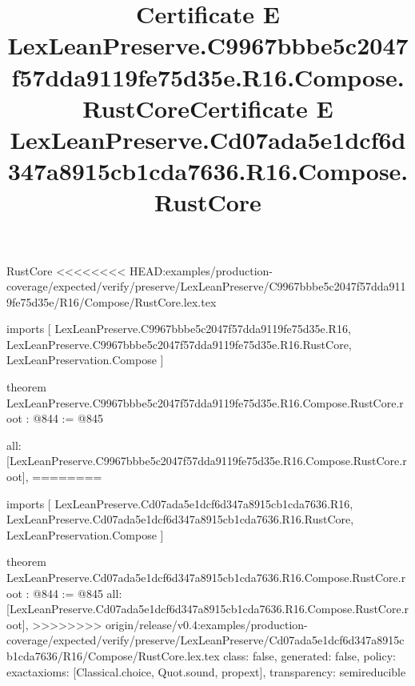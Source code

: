 \begin{lexlean}{RustCore}
<<<<<<<< HEAD:examples/production-coverage/expected/verify/preserve/LexLeanPreserve/C9967bbbe5c2047f57dda9119fe75d35e/R16/Compose/RustCore.lex.tex
\title{Certificate E LexLeanPreserve.C9967bbbe5c2047f57dda9119fe75d35e.R16.Compose.RustCore}
\begin{coremodule}
imports [
  LexLeanPreserve.C9967bbbe5c2047f57dda9119fe75d35e.R16,
  LexLeanPreserve.C9967bbbe5c2047f57dda9119fe75d35e.R16.RustCore,
  LexLeanPreservation.Compose
]

theorem LexLeanPreserve.C9967bbbe5c2047f57dda9119fe75d35e.R16.Compose.RustCore.root : @844 := @845 {
  all: [LexLeanPreserve.C9967bbbe5c2047f57dda9119fe75d35e.R16.Compose.RustCore.root],
========
\title{Certificate E LexLeanPreserve.Cd07ada5e1dcf6d347a8915cb1cda7636.R16.Compose.RustCore}
\begin{coremodule}
imports [
  LexLeanPreserve.Cd07ada5e1dcf6d347a8915cb1cda7636.R16,
  LexLeanPreserve.Cd07ada5e1dcf6d347a8915cb1cda7636.R16.RustCore,
  LexLeanPreservation.Compose
]

theorem LexLeanPreserve.Cd07ada5e1dcf6d347a8915cb1cda7636.R16.Compose.RustCore.root : @844 := @845 {
  all: [LexLeanPreserve.Cd07ada5e1dcf6d347a8915cb1cda7636.R16.Compose.RustCore.root],
>>>>>>>> origin/release/v0.4:examples/production-coverage/expected/verify/preserve/LexLeanPreserve/Cd07ada5e1dcf6d347a8915cb1cda7636/R16/Compose/RustCore.lex.tex
  class: false,
  generated: false,
  policy: exact{axioms: [Classical.choice, Quot.sound, propext]},
  transparency: semireducible
}


\end{coremodule}}
\end{coremodule}
\end{lexlean}
